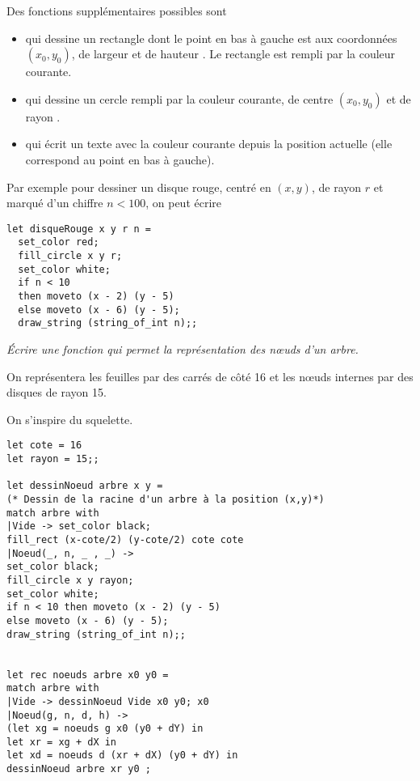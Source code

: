 Des fonctions supplémentaires possibles sont
\begin{itemize}
  \item {} qui dessine un rectangle dont le point en bas à gauche est aux coordonnées $(x_0,y_0)$, de largeur  et de hauteur . Le rectangle est rempli par la couleur courante.
  \item {} qui dessine un cercle rempli par la couleur courante, de centre $(x_0,y_0)$ et de rayon .
  \item {} qui écrit un texte avec la couleur courante depuis la position actuelle (elle correspond au point en bas à gauche).
\end{itemize}
Par exemple pour dessiner un disque rouge, centré en $(x,y)$, de rayon $r$ et marqué d'un chiffre $n<100$, on peut écrire
\begin{lstlisting}
let disqueRouge x y r n =
  set_color red; 
  fill_circle x y r;
  set_color white;
  if n < 10 
  then moveto (x - 2) (y - 5)
  else moveto (x - 6) (y - 5);
  draw_string (string_of_int n);;
\end{lstlisting}
\begin{Exercise}\it Écrire une fonction qui permet la représentation des nœuds d'un arbre.

On représentera les feuilles par des carrés de côté 16 et les nœuds internes par des disques de rayon 15.
\end{Exercise}
\begin{Answer}
On s'inspire du squelette.
\begin{lstlisting}
let cote = 16
let rayon = 15;;

let dessinNoeud arbre x y =
(* Dessin de la racine d'un arbre à la position (x,y)*)
match arbre with
|Vide -> set_color black;
fill_rect (x-cote/2) (y-cote/2) cote cote
|Noeud(_, n, _ , _) -> 
set_color black;
fill_circle x y rayon;
set_color white;
if n < 10 then moveto (x - 2) (y - 5)
else moveto (x - 6) (y - 5);
draw_string (string_of_int n);;


let rec noeuds arbre x0 y0 =
match arbre with
|Vide -> dessinNoeud Vide x0 y0; x0
|Noeud(g, n, d, h) -> 
(let xg = noeuds g x0 (y0 + dY) in
let xr = xg + dX in
let xd = noeuds d (xr + dX) (y0 + dY) in
dessinNoeud arbre xr y0 ;
\end{lstlisting}
\end{Answer}
